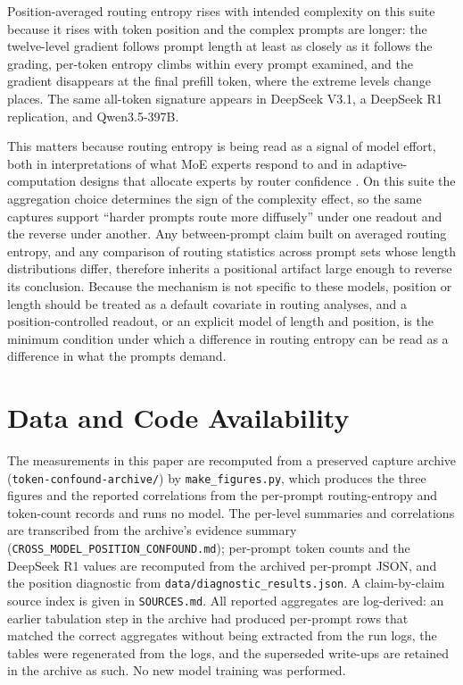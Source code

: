 \documentclass[10pt,twocolumn]{article}
\begin{document}
Position-averaged routing entropy rises with intended complexity on this
suite because it rises with token position and the complex prompts are
longer: the twelve-level gradient follows prompt length at least as closely
as it follows the grading, per-token entropy climbs within every prompt
examined, and the gradient disappears at the final prefill token, where the
extreme levels change places. The same all-token signature appears in
DeepSeek V3.1, a DeepSeek R1 replication, and Qwen3.5-397B.

This matters because routing entropy is being read as a signal of model
effort, both in interpretations of what MoE experts respond to and in
adaptive-computation designs that allocate experts by router confidence
\citep{huang2024harder,raposo2024mixture}. On this suite the aggregation
choice determines the sign of the complexity effect, so the same captures support ``harder prompts route more diffusely'' under one
readout and the reverse under another. Any between-prompt claim built on
averaged routing entropy, and any comparison of routing statistics across
prompt sets whose length distributions differ, therefore inherits a
positional artifact large enough to reverse its conclusion. Because the mechanism is not specific to these models, position or length
should be treated as a default covariate in routing analyses, and a position-controlled readout, or an
explicit model of length and position, is the minimum condition under which
a difference in routing entropy can be read as a difference in what the
prompts demand.

\section*{Data and Code Availability}

The measurements in this paper are recomputed from a preserved capture
archive (\texttt{token-confound-archive/}) by \texttt{make\_figures.py},
which produces the three figures and the reported correlations from the
per-prompt routing-entropy and token-count records and runs no model. The
per-level summaries and correlations are transcribed from the archive's
evidence summary (\texttt{CROSS\_MODEL\_POSITION\_CONFOUND.md}); per-prompt
token counts and the DeepSeek R1 values are recomputed from the archived
per-prompt JSON, and the position diagnostic from
\texttt{data/diagnostic\_results.json}. A claim-by-claim source index is
given in \texttt{SOURCES.md}. All reported aggregates are log-derived: an
earlier tabulation step in the archive had produced per-prompt rows that
matched the correct aggregates without being extracted from the run logs,
the tables were regenerated from the logs, and the superseded write-ups are
retained in the archive as such. No new model training was performed.
\end{document}
